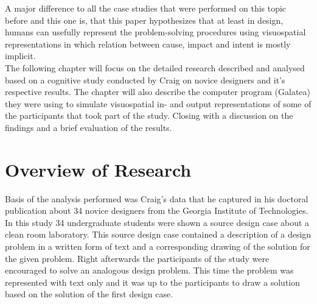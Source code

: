 \documentclass[12pt]{article}
\begin{document}
\indent A major difference to all the case studies that were performed on this topic before and this one is, that this paper hypothesizes that at least in design, humans can usefully represent the problem-solving procedures using visuospatial representations in which relation between cause, impact and intent is mostly implicit. \\
\indent The following chapter will focus on the detailed research described and analysed based on a cognitive study conducted by Craig \cite{craig2003perceptual} on novice designers and it's respective results. The chapter will also describe the computer program (Galatea) they were using to simulate visuospatial in- and output representations of some of the participants that took part of the study. Closing with a discussion on the findings and a brief evaluation of the results. 
\section{Overview of Research} %
Basis of the analysis performed was Craig's \cite{craig2001perceptual} %
data that he captured in his doctoral publication about 34 novice designers from the Georgia Institute of Technologies. In this study 34 undergraduate students were shown a source design case about a clean room laboratory. This source design case contained a description of a design problem in a written form of text and a corresponding drawing of the solution for the given problem. Right afterwards the participants of the study were encouraged to solve an analogous design problem. This time the problem was represented with text only and it was up to the participants to draw a solution based on the solution of the first design case. %
\end{document}
